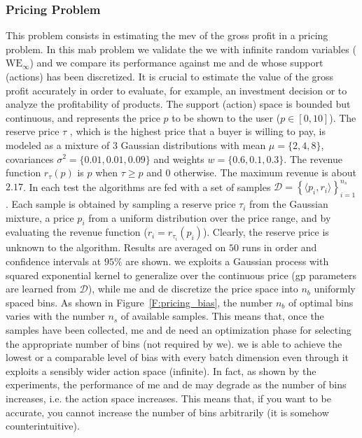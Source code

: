 \subsubsection{Pricing Problem}
This problem consists in estimating the \gls{mev} of the gross profit in a pricing problem. In this \gls{mab} problem we validate the \gls{we} with infinite random variables ($\text{WE}_{\infty}$) and we compare its performance against \gls{me} and \gls{de} whose support (actions) has been discretized.
It is crucial to estimate the value of the gross profit accurately in order to evaluate, for example, an investment decision or to analyze the profitability of products.
The support (action) space is bounded but continuous, and represents the price $p$ to be shown to the user ($p \in [0,10]$).
The reserve price $\tau$ , which is the highest price that a buyer is willing to pay, is modeled as a mixture of $3$ Gaussian distributions with mean $\mu=\lbrace 2, 4, 8 \rbrace$, covariances $\sigma^2= \lbrace 0.01, 0.01, 0.09 \rbrace$ and weights $w = \lbrace 0.6, 0.1, 0.3 \rbrace$.
The revenue function $r_{\tau}(p)$ is $p$ when $\tau \geq p$ and $0$ otherwise.
The maximum revenue is about $2.17$.
In each test the algorithms are fed with a set of samples $\mathcal{D} = \left\{ \langle p_i, r_i \rangle \right\}_{i=1}^{n_s}$. Each sample is obtained by sampling a reserve price $\tau_i$ from the Gaussian mixture, a price $p_i$ from a uniform distribution over the price range, and by evaluating the revenue function ($r_i=r_{\tau_i}(p_i)$). Clearly, the reserve price is unknown to the algorithm.
Results are averaged on $50$ runs in order and confidence intervals at $95\%$ are shown.
\gls{we} exploits a Gaussian process with squared exponential kernel to generalize over the continuous price (\gls{gp} parameters are learned from $\mathcal{D}$), while \gls{me} and \gls{de} discretize the price space into $n_b$ uniformly spaced bins.
As shown in Figure~\ref{F:pricing_bias}, the number $n_b$ of optimal bins varies with the number $n_s$ of available samples.
This means that, once the samples have been collected, \gls{me} and \gls{de} need an optimization phase for selecting the appropriate number of bins (not required by \gls{we}). 
\gls{we} is able to achieve the lowest or a comparable level of bias with every batch dimension even through it exploits a sensibly wider action space (infinite).
In fact, as shown by the experiments, the performance of \gls{me} and \gls{de} may degrade as the number of bins increases, i.e. the action space increases.
This means that, if you want to be accurate, you cannot increase the number of bins arbitrarily (it is somehow counterintuitive).
